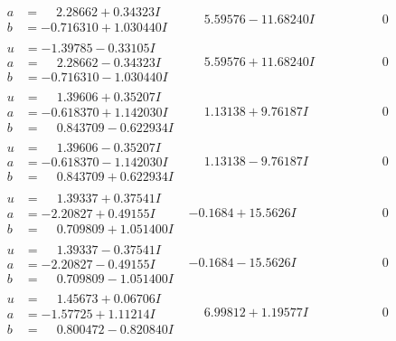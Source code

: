 \documentclass[1p]{elsarticle_modified}
\theoremstyle{definition}
\begin{document}
$$\begin{array}{c|c|c}
\begin{aligned}
a &= \phantom{-}2.28662 + 0.34323 I \\
b &= -0.716310 + 1.030440 I\end{aligned}
 & \phantom{-}5.59576 - 11.68240 I & \phantom{-0.000000 } 0 \\ \hline\begin{aligned}
u &= -1.39785 - 0.33105 I \\
a &= \phantom{-}2.28662 - 0.34323 I \\
b &= -0.716310 - 1.030440 I\end{aligned}
 & \phantom{-}5.59576 + 11.68240 I & \phantom{-0.000000 } 0 \\ \hline\begin{aligned}
u &= \phantom{-}1.39606 + 0.35207 I \\
a &= -0.618370 + 1.142030 I \\
b &= \phantom{-}0.843709 - 0.622934 I\end{aligned}
 & \phantom{-}1.13138 + 9.76187 I & \phantom{-0.000000 } 0 \\ \hline\begin{aligned}
u &= \phantom{-}1.39606 - 0.35207 I \\
a &= -0.618370 - 1.142030 I \\
b &= \phantom{-}0.843709 + 0.622934 I\end{aligned}
 & \phantom{-}1.13138 - 9.76187 I & \phantom{-0.000000 } 0 \\ \hline\begin{aligned}
u &= \phantom{-}1.39337 + 0.37541 I \\
a &= -2.20827 + 0.49155 I \\
b &= \phantom{-}0.709809 + 1.051400 I\end{aligned}
 & -0.1684 + 15.5626 I & \phantom{-0.000000 } 0 \\ \hline\begin{aligned}
u &= \phantom{-}1.39337 - 0.37541 I \\
a &= -2.20827 - 0.49155 I \\
b &= \phantom{-}0.709809 - 1.051400 I\end{aligned}
 & -0.1684 - 15.5626 I & \phantom{-0.000000 } 0 \\ \hline\begin{aligned}
u &= \phantom{-}1.45673 + 0.06706 I \\
a &= -1.57725 + 1.11214 I \\
b &= \phantom{-}0.800472 - 0.820840 I\end{aligned}
 & \phantom{-}6.99812 + 1.19577 I & \phantom{-0.000000 } 0 \\ \hline\begin{aligned}

\end{aligned}
\end{array}$$
\end{document}
